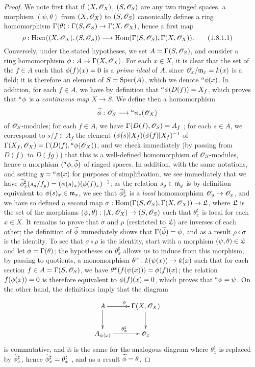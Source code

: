 \begin{proof}
\label{proof-1.1.8.1}
We note first that if $(X,\mathscr{O}_X)$, $(S,\mathscr{O}_S)$ are any two ringed spaces, a morphism
$(\psi,\theta)$ from $(X,\mathscr{O}_X)$ to $(S,\mathscr{O}_S)$ canonically defines a ring homomorphism
$\Gamma(\theta):\Gamma(S,\mathscr{O}_S)\to\Gamma(X,\mathscr{O}_X)$, hence a first map
\[
  \rho:{\mathop{\mathrm{Hom}}\nolimits}((X,\mathscr{O}_X),(S,\mathscr{O}_S))\longrightarrow{\mathop{\mathrm{Hom}}\nolimits}(\Gamma(S,\mathscr{O}_S),\Gamma(X,\mathscr{O}_X)).
  \tag{1.8.1.1}
\]
Conversely, under the stated hypotheses, we set $A=\Gamma(S,\mathscr{O}_S)$, and consider a ring
homomorphism $\phi:A\to\Gamma(X,\mathscr{O}_X)$. For each $x\in X$, it is clear that the set of the
$f\in A$ such that $\phi(f)(x)=0$ is a \emph{prime ideal} of $A$, since
$\mathscr{O}_x/\mathfrak{m}_x=k(x)$ is a field; it is therefore an element of $S={\mathop{\mathrm{Spec}}\nolimits}(A)$, which
we denote ${}^a\phi(x)$. In addition, for each $f\in A$, we have by definition
 that ${}^a\phi(D(f))=X_f$, which proves that ${}^a\phi$ is a
\emph{continuous map} $X\to S$. We define then a homomorphism
\[
  \widetilde{\phi}:\mathscr{O}_S\longrightarrow{}^a\phi_*(\mathscr{O}_X)
\]
of $\mathscr{O}_S$-modules; for each $f\in A$, we have $\Gamma(D(f),\mathscr{O}_S)=A_f$ ;
for each $s\in A$, we correspond to $s/f\in A_f$ the element
$(\phi(s)|X_f)(\phi(f)|X_f)^{-1}$ of $\Gamma(X_f,\mathscr{O}_X)=\Gamma(D(f),{}^a\phi(\mathscr{O}_X))$, and
we check immediately (by passing from $D(f)$ to $D(fg)$) that this is a well-defined
homomorphism of $\mathscr{O}_S$-modules, hence a morphism $({}^a\phi,\widetilde{\phi})$ of ringed
spaces. In addition, with the same notations, and setting $y={}^a\phi(x)$ for purposes of
simplification, we see immediately  that we have
$\widetilde{\phi}_x^\sharp(s_y/f_y)=(\phi(s)_x)(\phi(f)_x)^{-1}$; as the relation
$s_y\in\mathfrak{m}_y$ is by definition equivalent to $\phi(s)_x\in\mathfrak{m}_x$, we see
that $\widetilde{\phi}_x^\sharp$ is a \emph{local} homomorphism $\mathscr{O}_y\to\mathscr{O}_x$, and we have
so defined a second map $\sigma:{\mathop{\mathrm{Hom}}\nolimits}(\Gamma(S,\mathscr{O}_S),\Gamma(X,\mathscr{O}_X))\to\mathfrak{L}$, where
$\mathfrak{L}$ is the set of the morphisms $(\psi,\theta):(X,\mathscr{O}_X)\to(S,\mathscr{O}_S)$ such that
$\theta_x^\sharp$ is local for each $x\in X$. It remains to prove that $\sigma$ and $\rho$
(restricted to $\mathfrak{L}$) are inverses of each other; the definition of
$\widetilde{\phi}$ immediately shows that $\Gamma(\widetilde{\phi})=\phi$, and as a result
$\rho\circ\sigma$ is the identity. To see that $\sigma\circ\rho$ is the identity, start with a
morphism $(\psi,\theta)\in\mathfrak{L}$ and let $\phi=\Gamma(\theta)$; the hypotheses on
$\theta_x^\sharp$ allows us to induce from this morphism, by passing to quotients, a
monomorphism $\theta^x:k(\psi(x))\to k(x)$ such that for each section
$f\in A=\Gamma(S,\mathscr{O}_S)$, we have $\theta^x(f(\psi(x)))=\phi(f)(x)$; the relation
$f(\phi(x))=0$ is therefore equivalent to $\phi(f)(x)=0$, which proves that
${}^a\phi=\psi$. On the other hand, the definitions imply that the diagram
\[
  \xymatrix{
    A\ar[r]^\vphi\ar[d] &
    \Gamma(X,\OO_X)\ar[d]\\
    A_{\psi(x)}\ar[r]^{\theta_x^\sharp} &
    \OO_x
  }
\]
is commutative, and it is the same for the analogous diagram where $\theta_x^\sharp$ is
replaced by $\widetilde{\phi}_x^\sharp$, hence $\widetilde{\phi}_x^\sharp=\theta_x^\sharp$
, and as a result $\widetilde{\phi}=\theta$.
\end{proof}

